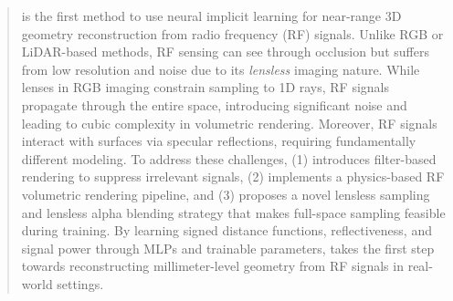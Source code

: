 \begin{abstract}

\name{} is the first method to use neural implicit learning for near-range 3D geometry reconstruction from radio frequency (RF) signals.
Unlike RGB or LiDAR-based methods, RF sensing can see through occlusion but suffers from low resolution and noise due to its \textit{lensless} imaging nature.  
While lenses in RGB imaging constrain sampling to 1D rays, RF signals propagate through the entire space, introducing significant noise and leading to cubic complexity in volumetric rendering.
Moreover, RF signals interact with surfaces via specular reflections,
requiring fundamentally different modeling.
To address these challenges, \name{} 
(1) introduces filter-based rendering to suppress irrelevant signals, 
(2) implements a physics-based RF volumetric rendering pipeline, and 
(3) proposes a novel lensless sampling and lensless alpha blending strategy that makes full-space sampling feasible during training.  
By learning signed distance functions, reflectiveness, and signal power through MLPs and trainable parameters, \name{} takes the first step towards reconstructing millimeter-level geometry from RF signals in real-world settings.
\end{abstract}
    
    